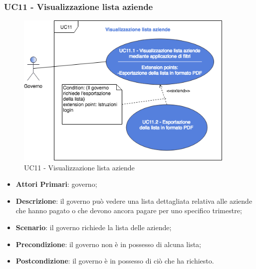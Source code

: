 \subsubsection{UC11 - Visualizzazione lista aziende}
 \begin{figure}[h]
 	\includegraphics[width=10.5cm]{res/images/UC11Visualizzazione.png} %
 	\centering
 	\caption{UC11 - Visualizzazione lista aziende}
 	
 \end{figure}
 \begin{itemize}
 	\item \textbf{Attori Primari}: governo;
 	\item \textbf{Descrizione}: il governo può vedere una lista dettagliata relativa alle aziende che hanno pagato o che devono ancora pagare per uno specifico trimestre;
 	\item \textbf{Scenario}: il governo richiede la lista delle aziende;
 	\item \textbf{Precondizione}: il governo non è in possesso di alcuna lista;
 	\item \textbf{Postcondizione}: il governo è in possesso di ciò che ha richiesto.
 \end{itemize}
